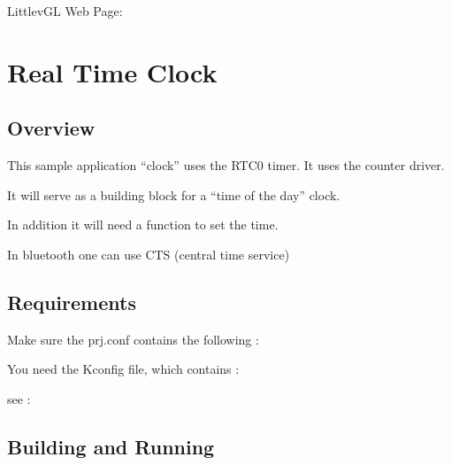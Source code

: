 \documentclass[letterpaper,10pt,english]{sphinxmanual}
\begin{document}
LittlevGL Web Page: 


\chapter{Real Time Clock}
\label{\detokenize{RTC:real-time-clock}}\label{\detokenize{RTC:rtc}}\label{\detokenize{RTC::doc}}

\section{Overview}
\label{\detokenize{RTC:overview}}
This sample application “clock” uses the RTC0 timer.
It uses the counter driver.

It will serve as a building block for a “time of the day” clock.

In addition it will need a function to set the time.

In bluetooth one can use CTS (central time service)


\section{Requirements}
\label{\detokenize{RTC:requirements}}
Make sure the prj.conf contains the following :

\begin{sphinxVerbatim}[commandchars=\\\{\}]
\end{sphinxVerbatim}

You need the Kconfig file, which contains :

\begin{sphinxVerbatim}[commandchars=\\\{\}]
 
           
\end{sphinxVerbatim}

see : {\hyperref[\detokenize{samples/gui/clock/README:clock-sample}]{}}


\section{Building and Running}
\label{\detokenize{RTC:building-and-running}}
\begin{sphinxVerbatim}[commandchars=\\\{\}]
\end{sphinxVerbatim}
\end{document}

